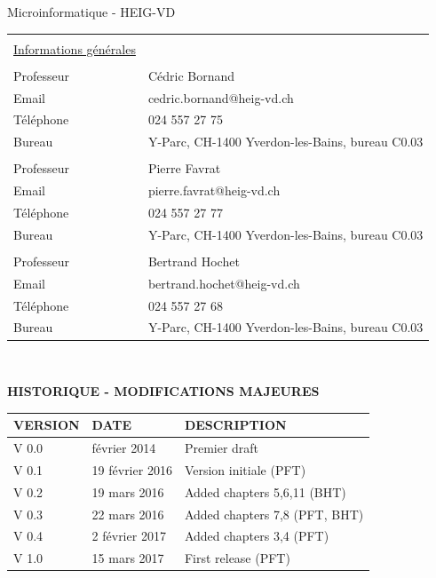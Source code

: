 \documentclass[10pt,a4paper]{book}
\begin{document}
\newpage
{} \setcounter{page}{1}


\begin{center}
Microinformatique - HEIG-VD

\end{center}

\begin{tabular}{p{4cm}p{10cm}}
&\\
\underline{Informations générales}& \\
&\\
Professeur & Cédric Bornand\\
Email & cedric.bornand@heig-vd.ch\\
Téléphone & 024 557 27 75 \\
Bureau & Y-Parc, CH-1400 Yverdon-les-Bains, bureau C0.03
\\
\-
\\
Professeur & Pierre Favrat\\
Email & pierre.favrat@heig-vd.ch\\
Téléphone & 024 557 27 77 \\
Bureau & Y-Parc, CH-1400 Yverdon-les-Bains, bureau C0.03
\\
\-
\\
Professeur & Bertrand Hochet\\
Email & bertrand.hochet@heig-vd.ch\\
Téléphone & 024 557 27 68 \\
Bureau & Y-Parc, CH-1400 Yverdon-les-Bains, bureau C0.03
\\
\end{tabular} \\


\newpage


\textbf{HISTORIQUE - MODIFICATIONS MAJEURES}\\

\begin{tabular}{|p{2.5cm}|p{2.5cm}|p{8.5cm}|}
\hline 
VERSION & DATE & DESCRIPTION\\ \hline 
V 0.0 & février 2014& Premier draft\\ \hline 
V 0.1 & 19 février 2016 & Version initiale (PFT)\\ \hline 
V 0.2 & 19 mars 2016 & Added chapters 5,6,11 (BHT)\\ \hline
V 0.3 & 22 mars 2016 & Added chapters 7,8 (PFT, BHT)\\ \hline  
V 0.4 & 2 février 2017 & Added chapters 3,4 (PFT)\\ \hline
V 1.0 & 15 mars 2017 & First release (PFT)\\ \hline
\end{tabular}
\end{document}
